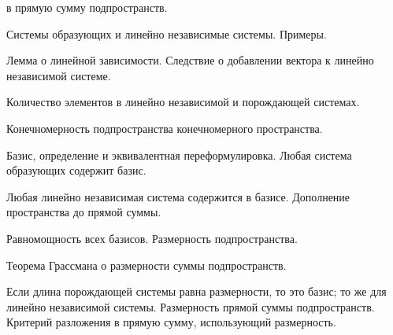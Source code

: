 \documentclass[12pt]{article}
\begin{document}
\begin{compactenum}
  в прямую сумму подпространств.
\item Системы образующих и линейно независимые системы. Примеры.
\item Лемма о линейной зависимости. Следствие о добавлении вектора
к линейно независимой системе.
\item Количество элементов в линейно независимой и порождающей
системах.
\item Конечномерность подпространства конечномерного пространства.
\item Базис, определение и эквивалентная переформулировка.
Любая система образующих содержит базис.
\item Любая линейно независимая система содержится в базисе.
Дополнение пространства до прямой суммы.
\item Равномощность всех базисов. Размерность подпространства.
\item Теорема Грассмана о размерности суммы подпространств.
\item Если длина порождающей системы равна размерности, то это
базис; то же для линейно независимой системы.
Размерность прямой суммы подпространств. Критерий разложения
в прямую сумму, использующий размерность.
\end{compactenum}
\end{document}
